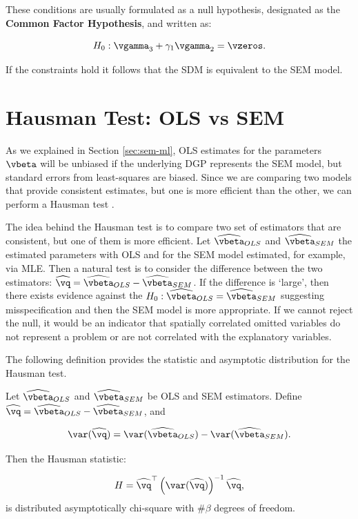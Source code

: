 \documentclass[english,12pt]{book}\usepackage[]{graphicx}\usepackage[]{xcolor}
\begin{document}
These conditions are usually formulated as a null hypothesis, designated as the \textbf{Common Factor Hypothesis}, and written as:

\begin{equation}
  H_0:\vgamma_3  + \gamma_1\vgamma_2 = \vzeros.
\end{equation}

If the constraints hold it follows that the SDM is equivalent to the SEM model. 

\section{Hausman Test: OLS vs SEM}

As we explained in Section \ref{sec:sem-ml}, OLS estimates for the parameters $\vbeta$ will be unbiased if the underlying DGP represents the SEM model, but standard errors from least-squares are biased. Since we are comparing two models that provide consistent estimates, but one is more efficient than the other, we can perform a Hausman test \citep{pace2008spatial}. 

The idea behind the Hausman test is to compare two set of estimators that are consistent, but one of them is more efficient. Let $\widehat{\vbeta}_{OLS}$ and $\widehat{\vbeta}_{SEM}$ the estimated parameters with OLS and for the SEM model estimated, for example, via MLE. Then a natural test is to consider the difference between the two estimators: $\widehat{\vq}=\widehat{\vbeta}_{OLS}-\widehat{\vbeta}_{SEM}$. If the difference is `large', then there exists evidence against the $H_0:\widehat{\vbeta}_{OLS}=\widehat{\vbeta}_{SEM}$ suggesting misspecification and then the SEM model is more appropriate. If we cannot reject the null, it would be an indicator that spatially correlated omitted variables do not represent a problem or are not correlated with the explanatory variables. 


The following definition provides the statistic and asymptotic distribution for the Hausman test. 

\begin{definition} 
Let $\widehat{\vbeta}_{OLS}$ and $\widehat{\vbeta}_{SEM}$ be OLS and SEM estimators. Define $\widehat{\vq} = \widehat{\vbeta}_{OLS}-\widehat{\vbeta}_{SEM}$, and

\begin{equation}
\var(\widehat{\vq})=\var(\widehat{\vbeta}_{OLS}) - \var(\widehat{\vbeta}_{SEM}).
\end{equation}

Then the Hausman statistic:

\begin{equation}
H=\widehat{\vq}^\top\left(\var(\widehat{\vq})\right)^{-1}\widehat{\vq}, 
\end{equation}
%
is distributed asymptotically chi-square with $\#\beta$ degrees of freedom.
\end{definition}
\end{document}
